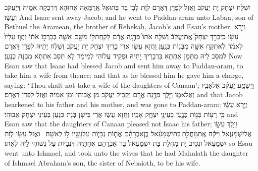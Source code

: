 {וּשְׁלַח יִצְחָק יָת יַעֲקֹב וַאֲזַל לְפַדַּן דַּאֲרָם לְוָת לָבָן בַּר בְּתוּאֵל אֲרַמָּאָה אֲחוּהָא דְּרִבְקָה אִמֵּיהּ דְּיַעֲקֹב וְעֵשָׂו׃}
{And Isaac sent away Jacob; and he went to Paddan-aram unto Laban, son of Bethuel the Aramean, the brother of Rebekah, Jacob’s and Esau’s mother.}{}
{וַיַּ֣רְא עֵשָׂ֗ו כִּֽי\maqqaf בֵרַ֣ךְ יִצְחָק֮ אֶֽת\maqqaf יַעֲקֹב֒ וְשִׁלַּ֤ח אֹתוֹ֙ פַּדֶּ֣נָֽה אֲרָ֔ם לָקַֽחַת\maqqaf ל֥וֹ מִשָּׁ֖ם אִשָּׁ֑ה בְּבָרְכ֣וֹ אֹת֔וֹ וַיְצַ֤ו עָלָיו֙ לֵאמֹ֔ר לֹֽא\maqqaf תִקַּ֥ח אִשָּׁ֖ה מִבְּנ֥וֹת כְּנָֽעַן׃}
{וַחֲזָא עֵשָׂו אֲרֵי בָרֵיךְ יִצְחָק יָת יַעֲקֹב וְשַׁלַּח יָתֵיהּ לְפַדַּן דַּאֲרָם לְמִסַּב לֵיהּ מִתַּמָּן אִתְּתָא בִּדְבָרֵיךְ יָתֵיהּ וּפַקֵּיד עֲלוֹהִי לְמֵימַר לָא תִּסַּב אִתְּתָא מִבְּנָת כְּנָעַן׃}
{Now Esau saw that Isaac had blessed Jacob and sent him away to Paddan-aram, to take him a wife from thence; and that as he blessed him he gave him a charge, saying: ‘Thou shalt not take a wife of the daughters of Canaan’;}{}
{וַיִּשְׁמַ֣ע יַעֲקֹ֔ב אֶל\maqqaf אָבִ֖יו וְאֶל\maqqaf אִמּ֑וֹ וַיֵּ֖לֶךְ פַּדֶּ֥נָֽה אֲרָֽם׃}
{וְקַבֵּיל יַעֲקֹב מִן אֲבוּהִי וּמִן אִמֵּיהּ וַאֲזַל לְפַדַּן דַּאֲרָם׃}
{and that Jacob hearkened to his father and his mother, and was gone to Paddan-aram;}{}
{וַיַּ֣רְא עֵשָׂ֔ו כִּ֥י רָע֖וֹת בְּנ֣וֹת כְּנָ֑עַן בְּעֵינֵ֖י יִצְחָ֥ק אָבִֽיו׃}
{וַחֲזָא עֵשָׂו אֲרֵי בִּישָׁן בְּנָת כְּנָעַן בְּעֵינֵי יִצְחָק אֲבוּהִי׃}
{and Esau saw that the daughters of Canaan pleased not Isaac his father;}{}
{וַיֵּ֥לֶךְ עֵשָׂ֖ו אֶל\maqqaf יִשְׁמָעֵ֑אל וַיִּקַּ֡ח אֶֽת\maqqaf מָחֲלַ֣ת \legarmeh  בַּת\maqqaf יִשְׁמָעֵ֨אל בֶּן\maqqaf אַבְרָהָ֜ם אֲח֧וֹת נְבָי֛וֹת עַל\maqqaf נָשָׁ֖יו ל֥וֹ לְאִשָּֽׁה׃ \setuma }
{וַאֲזַל עֵשָׂו לְוָת יִשְׁמָעֵאל וּנְסֵיב יָת מָחֲלַת בַּת יִשְׁמָעֵאל בַּר אַבְרָהָם אֲחָתֵיהּ דִּנְבָיוֹת עַל נְשׁוֹהִי לֵיהּ לְאִתּוּ׃}
{so Esau went unto Ishmael, and took unto the wives that he had Mahalath the daughter of Ishmael Abraham’s son, the sister of Nebaioth, to be his wife.}{}
